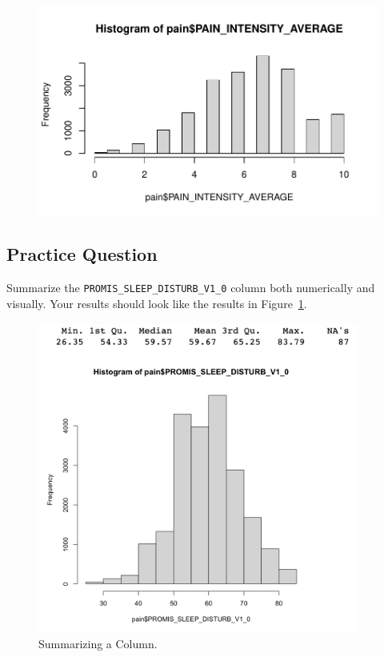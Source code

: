 \documentclass[
  letterpaper,
]{krantz}
\begin{document}
\begin{figure}[H]

{\centering \includegraphics[width=1\textwidth,height=\textheight]{book/3_data_files_files/figure-pdf/unnamed-chunk-12-1.pdf}

}

\end{figure}

\hypertarget{practice-question-3}{%
\subsection{Practice Question}\label{practice-question-3}}

Summarize the \texttt{PROMIS\_SLEEP\_DISTURB\_V1\_0} column both
numerically and visually. Your results should look like the results in
Figure~\ref{fig-pq1}.

\begin{figure}

{\centering \includegraphics[width=4.16667in,height=\textheight]{book/images/3-practicequestion1answer.png}

}

\caption{\label{fig-pq1}Summarizing a Column.}

\end{figure}
\end{document}
